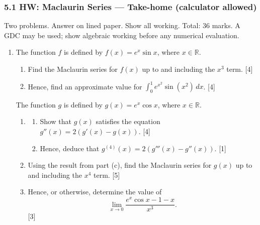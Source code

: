 \documentclass[12pt, twoside]{article}
\begin{document}
\subsubsection*{5.1 HW: Maclaurin Series --- Take-home (calculator allowed)}

Two problems. Answer on lined paper. Show all working.
Total: 36 marks. A GDC may be used; show algebraic working before any
numerical evaluation.

\begin{enumerate}[itemsep=0.15cm]

\item[4.] 

The function $f$ is defined by $f(x) = e^{x} \sin x$, where
$x \in \mathbb{R}$.

\begin{enumerate}[itemsep=0.15cm]
  \item Find the Maclaurin series for $f(x)$ up to and including the
  $x^{3}$ term. \hfill [4]
  \item Hence, find an approximate value for
  $\displaystyle\int_{0}^{1} e^{x^{2}} \sin\!\left(x^{2}\right)\, dx$.
  \hfill [4]
\end{enumerate}

The function $g$ is defined by $g(x) = e^{x} \cos x$, where
$x \in \mathbb{R}$.

\begin{enumerate}[itemsep=0.15cm]
  \item[(c)] \begin{enumerate}[itemsep=0.15cm]
    \item[(i)] Show that $g(x)$ satisfies the equation
    $g''(x) = 2\!\left(g'(x) - g(x)\right)$. \hfill [4]
    \item[(ii)] Hence, deduce that
    $g^{(4)}(x) = 2\!\left(g'''(x) - g''(x)\right)$. \hfill [1]
  \end{enumerate}
  \item[(d)] Using the result from part (c), find the Maclaurin series
  for $g(x)$ up to and including the $x^{4}$ term. \hfill [5]
  \item[(e)] Hence, or otherwise, determine the value of
  \[
  \lim_{x \to 0}\frac{e^{x} \cos x - 1 - x}{x^{3}}.
  \]
  \hfill [3]
\end{enumerate}


\end{enumerate}
\end{document}
